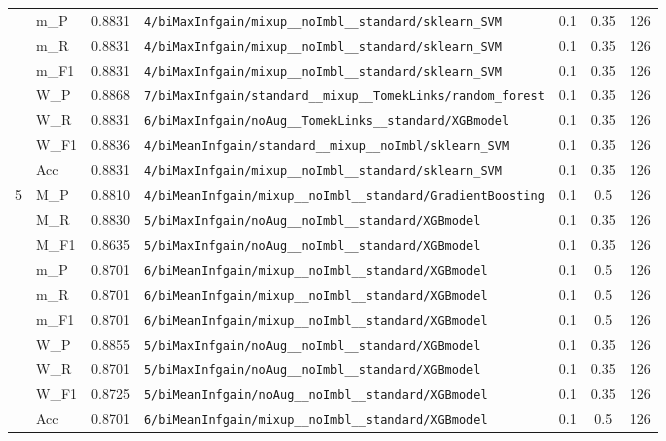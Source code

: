 \begin{table}[htbp]
\begin{tabular}{|c|l|c|>{\ttfamily\footnotesize}p{7.2cm}|c|c|c|}
 & m\_P & 0.8831 & \texttt{4/biMaxInfgain/mixup\_\_noImbl\_\_standard/sklearn\_SVM} & 0.1 & 0.35  & 126 \\ 
 & m\_R & 0.8831 & \texttt{4/biMaxInfgain/mixup\_\_noImbl\_\_standard/sklearn\_SVM} & 0.1 & 0.35  & 126 \\ 
 & m\_F1 & 0.8831 & \texttt{4/biMaxInfgain/mixup\_\_noImbl\_\_standard/sklearn\_SVM} & 0.1 & 0.35  & 126 \\ 
 & W\_P & 0.8868 & \texttt{7/biMaxInfgain/standard\_\_mixup\_\_TomekLinks/random\_forest} & 0.1 & 0.35  & 126 \\ 
 & W\_R & 0.8831 & \texttt{6/biMaxInfgain/noAug\_\_TomekLinks\_\_standard/XGBmodel} & 0.1 & 0.35  & 126 \\ 
 & W\_F1 & 0.8836 & \texttt{4/biMeanInfgain/standard\_\_mixup\_\_noImbl/sklearn\_SVM} & 0.1 & 0.35  & 126 \\ 
 & Acc & 0.8831 & \texttt{4/biMaxInfgain/mixup\_\_noImbl\_\_standard/sklearn\_SVM} & 0.1 & 0.35  & 126 \\ 
\hline
\multirow{10}{*}{5} & M\_P & 0.8810 & \texttt{4/biMeanInfgain/mixup\_\_noImbl\_\_standard/GradientBoosting} & 0.1 & 0.5  & 126 \\ 
 & M\_R & 0.8830 & \texttt{5/biMaxInfgain/noAug\_\_noImbl\_\_standard/XGBmodel} & 0.1 & 0.35  & 126 \\ 
 & M\_F1 & 0.8635 & \texttt{5/biMaxInfgain/noAug\_\_noImbl\_\_standard/XGBmodel} & 0.1 & 0.35  & 126 \\ 
 & m\_P & 0.8701 & \texttt{6/biMeanInfgain/mixup\_\_noImbl\_\_standard/XGBmodel} & 0.1 & 0.5  & 126 \\ 
 & m\_R & 0.8701 & \texttt{6/biMeanInfgain/mixup\_\_noImbl\_\_standard/XGBmodel} & 0.1 & 0.5  & 126 \\ 
 & m\_F1 & 0.8701 & \texttt{6/biMeanInfgain/mixup\_\_noImbl\_\_standard/XGBmodel} & 0.1 & 0.5  & 126 \\ 
 & W\_P & 0.8855 & \texttt{5/biMaxInfgain/noAug\_\_noImbl\_\_standard/XGBmodel} & 0.1 & 0.35  & 126 \\ 
 & W\_R & 0.8701 & \texttt{5/biMaxInfgain/noAug\_\_noImbl\_\_standard/XGBmodel} & 0.1 & 0.35  & 126 \\ 
 & W\_F1 & 0.8725 & \texttt{5/biMeanInfgain/noAug\_\_noImbl\_\_standard/XGBmodel} & 0.1 & 0.35  & 126 \\ 
 & Acc & 0.8701 & \texttt{6/biMeanInfgain/mixup\_\_noImbl\_\_standard/XGBmodel} & 0.1 & 0.5  & 126 \\ 
\hline
\end{tabular}
\end{table}